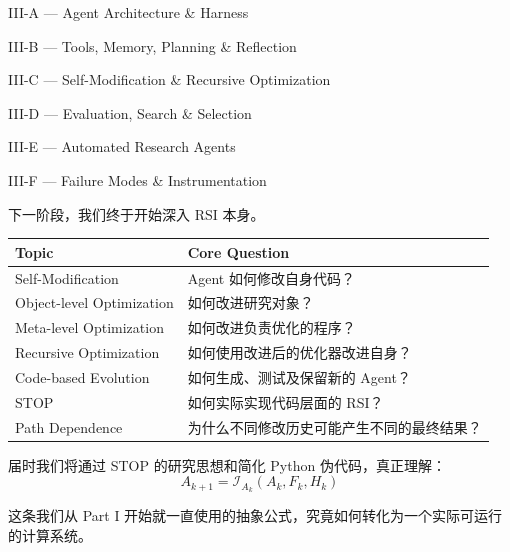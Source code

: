 III-A --- Agent Architecture \& Harness

III-B --- Tools, Memory, Planning \& Reflection

III-C --- Self-Modification \& Recursive Optimization

III-D --- Evaluation, Search \& Selection

III-E --- Automated Research Agents

III-F --- Failure Modes \& Instrumentation

下一阶段，我们终于开始深入 RSI 本身。

\begin{readertable}
\begin{longtable}[]{@{}
  >{\raggedright\arraybackslash}p{}
  >{\raggedright\arraybackslash}p{}@{}}
\toprule
Topic & Core Question \\
\midrule
\endhead
Self-Modification & Agent 如何修改自身代码？ \\
Object-level Optimization & 如何改进研究对象？ \\
Meta-level Optimization & 如何改进负责优化的程序？ \\
Recursive Optimization & 如何使用改进后的优化器改进自身？ \\
Code-based Evolution & 如何生成、测试及保留新的 Agent？ \\
STOP & 如何实际实现代码层面的 RSI？ \\
Path Dependence & 为什么不同修改历史可能产生不同的最终结果？ \\
\bottomrule
\end{longtable}
\end{readertable}

届时我们将通过 STOP 的研究思想和简化 Python 伪代码，真正理解：
\[A_{k+1}
=
\mathcal I_{A_k}(A_k,F_k,H_k)\]

这条我们从 Part I 开始就一直使用的抽象公式，究竟如何转化为一个实际可运行的计算系统。
